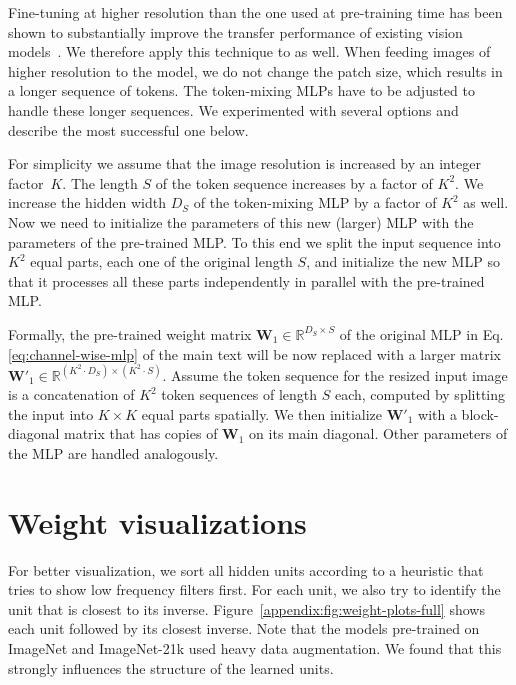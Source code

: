Fine-tuning at higher resolution than the one used at pre-training time has been shown to substantially improve the transfer performance of existing vision models~\citep{touvron2019,kolesnikov2020-bit,Dosovitskiy2021}.
We therefore apply this technique to \name{} as well. 
When feeding images of higher resolution to the model, we do not change the patch size, which results in a longer sequence of tokens.
The token-mixing MLPs have to be adjusted to handle these longer sequences.
We experimented with several options and describe the most successful one below.

For simplicity we assume that the image resolution is increased by an integer factor~$K$.
The length $S$ of the token sequence increases by a factor of $K^2$.
We increase the hidden width $D_S$ of the token-mixing MLP by a factor of $K^2$ as well.
Now we need to initialize the parameters of this new (larger) MLP with the parameters of the pre-trained MLP.
To this end we split the input sequence into $K^2$ equal parts, each one of the original length $S$, and initialize the new MLP so that it processes all these parts independently in parallel with the pre-trained MLP.

Formally, the pre-trained weight matrix $\mathbf{W}_1\in\mathbb{R}^{D_S\times S}$ of the original MLP in Eq.\,\ref{eq:channel-wise-mlp} of the main text
will be now replaced with a larger matrix $\mathbf{W}'_1\in\mathbb{R}^{(K^2\cdot D_S)\times (K^2 \cdot S)}$.
Assume the token sequence for the resized input image is a concatenation of $K^2$ token sequences of length $S$ each, computed by splitting the input into $K \times K$ equal parts spatially.
We then initialize $\mathbf{W}'_1$ with a block-diagonal matrix that has copies of $\mathbf{W}_1$ on its main diagonal.
Other parameters of the MLP are handled analogously.

\section{Weight visualizations}\label{appendix:sec:weightvisualizations}
For better visualization, we sort all hidden units according to a heuristic that tries to show low frequency filters first.
For each unit, we also try to identify the unit that is closest to its inverse. Figure~\ref{appendix:fig:weight-plots-full} shows each unit followed by its closest inverse.
Note that the models pre-trained on ImageNet and ImageNet-21k used heavy data augmentation.
We found that this strongly influences the structure of the learned units.

